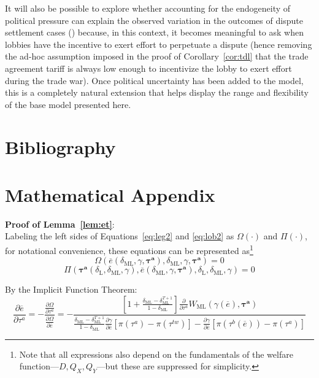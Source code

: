 \documentclass[authoryear, review]{elsarticle}
\newcommand{\ov}{\overline}
\newcommand{\bta}{\bm{\tau^a}}
\newcommand{\ga}{\gamma}
\newcommand{\de}{\delta}
\begin{document}
It will also be possible to explore whether accounting for the endogeneity of political pressure can explain the observed variation in the outcomes of dispute settlement cases (\citet{buschrein}) because, in this context, it becomes meaningful to ask when lobbies have the incentive to exert effort to perpetuate a dispute (hence removing the ad-hoc assumption imposed in the proof of Corollary~\ref{cor:tdl} that the trade agreement tariff is always low enough to incentivize the lobby to exert effort during the trade war). Once political uncertainty has been added to the model, this is a completely natural extension that helps display the range and flexibility of the base model presented here.


\section{Bibliography}

%

\newpage
\appendix

\section{Mathematical Appendix}
\noindent \textbf{\hypertarget{Cor_et}{Proof of Lemma~\ref{lem:et}}}: \\
Labeling the left sides of Equations~\ref{eq:leg2} and \ref{eq:lob2} as $\Omega\left(\cdot\right)$ and $\Pi\left(\cdot\right)$, for notational convenience, these equations can be represented as\footnote{Note that all expressions also depend on the fundamentals of the welfare function---$D,Q_X,Q_Y$---but these are suppressed for simplicity.}
\begin{equation}
  \Omega\left(\ov{e}\left(\de_\text{ML},\ga,\bta \right),\de_\text{ML},\ga,\bta \right) = 0
	\label{eq:leg3}
\end{equation}
\begin{equation}
  \Pi\left(\bta\left(\de_\text{L},\de_\text{ML},\ga\right),\ov{e}\left(\de_\text{ML},\ga,\bta\right),\de_\text{L},\de_\text{ML},\ga \right) = 0
  \label{eq:lob3}
\end{equation}


By the Implicit Function Theorem:
\begin{equation}
 	\frac{\partial \ov{e}}{\partial \tau^a} = -\frac{\frac{\partial \Omega}{\partial \tau^a}}{\frac{\partial \Omega}{\partial \ov{e}}} = -
	\textstyle \frac{\left[1+ \frac{\de_\text{ML} - \de_\text{ML}^{T+1}}{1-\de_\text{ML}}  \right]\frac{\partial}{\partial \tau^a}W_\text{ML}(\ga(\ov{e}),\bta)} {\frac{\de_\text{ML} - \de_\text{ML}^{T+1}}{1-\de_\text{ML}}\frac{\partial \ga}{\partial \ov{e}}\left[ \pi(\tau^a) - \pi(\tau^{tw}) \right] - \frac{\partial \ga}{\partial \ov{e}}\left[ \pi(\tau^b(\ov{e})) - \pi(\tau^{a}) \right]}
	\label{eq:coret}
\end{equation}
\end{document}
